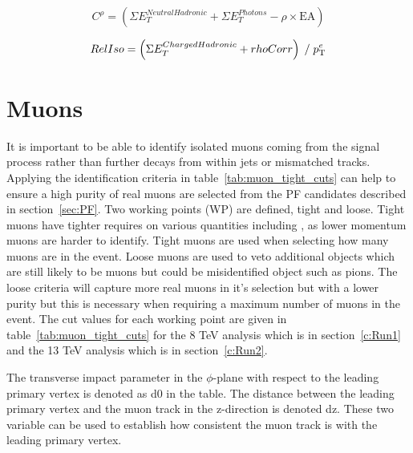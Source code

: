 \begin{centering}
\begin{equation}
C^{\rho} = \left( \Sigma E_{T}^{Neutral Hadronic} + \Sigma E_{T}^{Photons} - \rho\times\textrm{EA} \right) 
\label{eqn:rhoCorr}
\end{equation}
\end{centering}


\begin{centering}
\begin{equation}
RelIso = \left( \Sigma E_{T}^{Charged Hadronic} + rhoCorr \right) \; / \;   p_{\mathrm{T}}^{e}
\label{eqn:eRelIso}
\end{equation}
\end{centering}

\section{Muons \label{sec:muonreco}}

It is important to be able to identify isolated muons coming from the signal process rather than further decays from within jets or mismatched tracks. Applying the identification criteria in table~\ref{tab:muon_tight_cuts} can help to ensure a high purity of real muons are selected from the PF candidates described in section~\ref{sec:PF}. Two working points (WP) are defined, tight and loose. Tight muons have tighter requires on various quantities including \pt, as lower momentum muons are harder to identify. Tight muons are used when selecting how many muons are in the event. Loose muons are used to veto additional objects which are still likely to be muons but could be misidentified object such as pions. The loose criteria will capture more real muons in it's selection but with a lower purity but this is necessary when requiring a maximum number of muons in the event. The cut values for each working point are given in table~\ref{tab:muon_tight_cuts} for the 8 TeV analysis which is in section~\ref{c:Run1} and the 13 TeV analysis which is in section~\ref{c:Run2}.

The transverse impact parameter in the $\phi$-plane with respect to the leading primary vertex is denoted as d0 in the table. The distance between the leading primary vertex and the muon track in the z-direction is denoted dz. These two variable can be used to establish how consistent the muon track is with the leading primary vertex.



